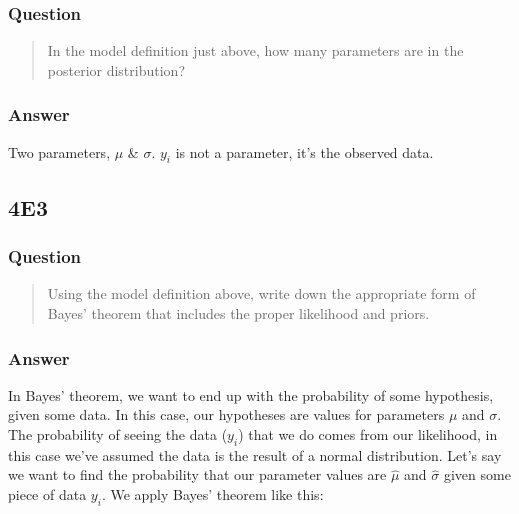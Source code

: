 \documentclass[
]{book}
\begin{document}
\hypertarget{question-34}{%
\subsubsection*{Question}\label{question-34}}

\begin{quote}
In the model definition just above, how many parameters are in the posterior distribution?
\end{quote}

\hypertarget{answer-34}{%
\subsubsection*{Answer}\label{answer-34}}

Two parameters, \(\mu\) \& \(\sigma\). \(y_i\) is not a parameter, it's the observed data.

\hypertarget{e3-2}{%
\subsection*{4E3}\label{e3-2}}

\hypertarget{question-35}{%
\subsubsection*{Question}\label{question-35}}

\begin{quote}
Using the model definition above, write down the appropriate form of Bayes' theorem that includes the proper likelihood and priors.
\end{quote}

\hypertarget{answer-35}{%
\subsubsection*{Answer}\label{answer-35}}

In Bayes' theorem, we want to end up with the probability of some hypothesis, given some data. In this case, our hypotheses are values for parameters \(\mu\) and \(\sigma\). The probability of seeing the data (\(y_i\)) that we do comes from our likelihood, in this case we've assumed the data is the result of a normal distribution. Let's say we want to find the probability that our parameter values are \(\hat\mu\) and \(\hat\sigma\) given some piece of data \(y_i\). We apply Bayes' theorem like this:
\end{document}
